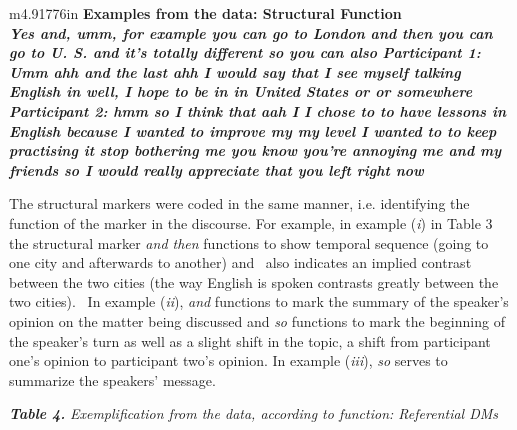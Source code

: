 \documentclass[12pt]{article}
\newcommand\textstyleListLabelxix[1]{\textup{#1}}
\newcommand\textstyleListLabelxlix[1]{\textup{#1}}
\newenvironment{styleStandard}{\setlength\leftskip{0cm}\setlength\rightskip{0cm plus 1fil}\setlength\parindent{0cm}\setlength\parfillskip{0pt plus 1fil}\setlength\parskip{0in plus 1pt}\writerlistparindent\writerlistleftskip\leavevmode\normalfont\normalsize\writerlistlabel\ignorespaces}{\unskip\vspace{0.111in plus 0.0111in}\par}
\newcommand\writerlistleftskip{}
\newcommand\writerlistparindent{}
\newcommand\writerlistlabel{}
\newcommand\writerlistremovelabel{\aftergroup\let\aftergroup\writerlistparindent\aftergroup\relax\aftergroup\let\aftergroup\writerlistlabel\aftergroup\relax}
\newcounter{listWWNumxleveli}
\renewcommand\thelistWWNumxleveli{\arabic{listWWNumxleveli}}
\newcommand\labellistWWNumxleveli{\textstyleListLabelxix{\thelistWWNumxleveli.}}
\newenvironment{listWWNumxleveli}{\def\writerlistleftskip{\addtolength\leftskip{0.0cm}}\def\writerlistparindent{}\def\writerlistlabel{}\def\item{\def\writerlistparindent{\setlength\parindent{-0cm}}\def\writerlistlabel{\stepcounter{listWWNumxleveli}\makebox[0cm][l]{\labellistWWNumxleveli}\hspace{0cm}\writerlistremovelabel}}}{}
\newcounter{listWWNumxxxvleveli}
\renewcommand\thelistWWNumxxxvleveli{\arabic{listWWNumxxxvleveli}}
\newcommand\labellistWWNumxxxvleveli{\textstyleListLabelxlix{\thelistWWNumxxxvleveli.}}
\newenvironment{listWWNumxxxvleveli}{\def\writerlistleftskip{\addtolength\leftskip{0.0cm}}\def\writerlistparindent{}\def\writerlistlabel{}\def\item{\def\writerlistparindent{\setlength\parindent{-0cm}}\def\writerlistlabel{\stepcounter{listWWNumxxxvleveli}\makebox[0cm][l]{\labellistWWNumxxxvleveli}\hspace{0cm}\writerlistremovelabel}}}{}
\begin{document}
\begin{flushleft}
\tablehead{}
\begin{supertabular}{m{4.91776in}}
\hline
\bfseries Examples from the data: Structural Function\\\hline
\setcounter{listWWNumxxxvleveli}{0}
\begin{listWWNumxxxvleveli}
\item 
\textit{Yes and, umm, for example you can go to London and then you can go to U. S. and it’s totally different so you can also}\end{listWWNumxxxvleveli}
\setcounter{listWWNumxleveli}{0}
\begin{listWWNumxleveli}
\item 
\textit{Participant 1: Umm ahh and the last ahh I would say that I see myself talking English in well, I hope to be in in United States or or somewhere}\item 
\textit{Participant 2: hmm so I think that aah I I chose to to have lessons in English because I wanted to improve my my level I wanted to to keep practising it}\item 
\textit{stop bothering me you know you’re annoying me and my friends so I would really appreciate that you left right now}\end{listWWNumxleveli}
\\\hline
\end{supertabular}
\end{flushleft}
\begin{styleStandard}
The structural markers were coded in the same manner, i.e. identifying the function of the marker in the discourse. For example, in example (\textit{i}) in Table 3 the structural marker \textit{and then} functions to show temporal sequence (going to one city and afterwards to another) and \ also indicates an implied contrast between the two cities (the way English is spoken contrasts greatly between the two cities). \ In example (\textit{ii}), \textit{and} functions to mark the summary of the speaker’s opinion on the matter being discussed and\textit{ so} functions to mark the beginning of the speaker’s turn as well as a slight shift in the topic, a shift from participant one’s opinion to participant two’s opinion. In example (\textit{iii}), \textit{so }serves to summarize the speakers’ message. 
\end{styleStandard}

\begin{styleStandard}
\textbf{\textit{Table 4.}}\textit{ Exemplification from the data, according to function: Referential DMs}
\end{styleStandard}
\end{document}

